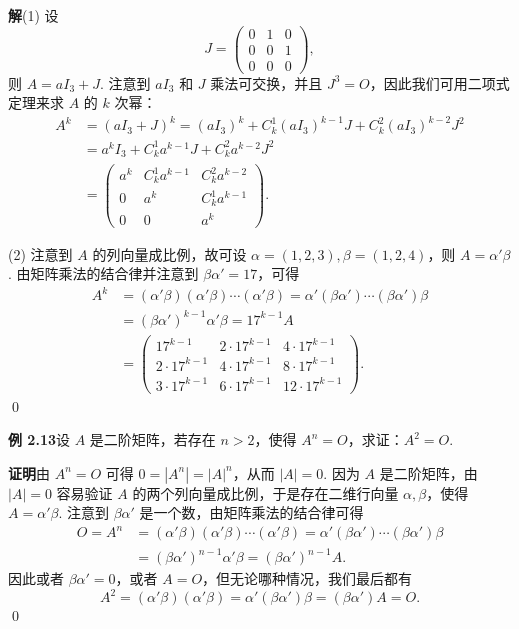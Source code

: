 \documentclass[UTF8, 12pt, fontset=fandol, oneside]{ctexart}
\begin{document}
\noindent\textbf{解}\quad (1) 设
\[
J=
\left(
\begin{array}{ccc}
0 & 1 & 0\\
0 & 0 & 1\\
0 & 0 & 0
\end{array}
\right),
\]
则 $A=aI_3+J$. 注意到 $aI_3$ 和 $J$ 乘法可交换，并且 $J^3=O$，因此我们可用二项式定理来求 $A$ 的 $k$ 次幂：
\[
\begin{aligned}
A^k
&=(aI_3+J)^k=(aI_3)^k+C_k^1(aI_3)^{k-1}J+C_k^2(aI_3)^{k-2}J^2\\
&=a^kI_3+C_k^1a^{k-1}J+C_k^2a^{k-2}J^2\\
&=
\left(
\begin{array}{ccc}
a^k & C_k^1a^{k-1} & C_k^2a^{k-2}\\
0 & a^k & C_k^1a^{k-1}\\
0 & 0 & a^k
\end{array}
\right).
\end{aligned}
\]

(2) 注意到 $A$ 的列向量成比例，故可设 $\alpha=(1,2,3),\beta=(1,2,4)$，则 $A=\alpha'\beta$. 由矩阵乘法的结合律并注意到 $\beta\alpha'=17$，可得
\[
\begin{aligned}
A^k
&=(\alpha'\beta)(\alpha'\beta)\cdots(\alpha'\beta)
=\alpha'(\beta\alpha')\cdots(\beta\alpha')\beta\\
&=(\beta\alpha')^{k-1}\alpha'\beta
=17^{k-1}A\\
&=
\left(
\begin{array}{ccc}
17^{k-1} & 2\cdot17^{k-1} & 4\cdot17^{k-1}\\
2\cdot17^{k-1} & 4\cdot17^{k-1} & 8\cdot17^{k-1}\\
3\cdot17^{k-1} & 6\cdot17^{k-1} & 12\cdot17^{k-1}
\end{array}
\right).
\end{aligned}
\]
\qed

\noindent\textbf{例 2.13}\quad 设 $A$ 是二阶矩阵，若存在 $n>2$，使得 $A^n=O$，求证：$A^2=O$.

\noindent\textbf{证明}\quad 由 $A^n=O$ 可得 $0=|A^n|=|A|^n$，从而 $|A|=0$. 因为 $A$ 是二阶矩阵，由 $|A|=0$ 容易验证 $A$ 的两个列向量成比例，于是存在二维行向量 $\alpha,\beta$，使得 $A=\alpha'\beta$. 注意到 $\beta\alpha'$ 是一个数，由矩阵乘法的结合律可得
\[
\begin{aligned}
O=A^n
&=(\alpha'\beta)(\alpha'\beta)\cdots(\alpha'\beta)
=\alpha'(\beta\alpha')\cdots(\beta\alpha')\beta\\
&=(\beta\alpha')^{n-1}\alpha'\beta
=(\beta\alpha')^{n-1}A.
\end{aligned}
\]
因此或者 $\beta\alpha'=0$，或者 $A=O$，但无论哪种情况，我们最后都有
\[
A^2=(\alpha'\beta)(\alpha'\beta)=\alpha'(\beta\alpha')\beta=(\beta\alpha')A=O.
\]
\qed
\end{document}

